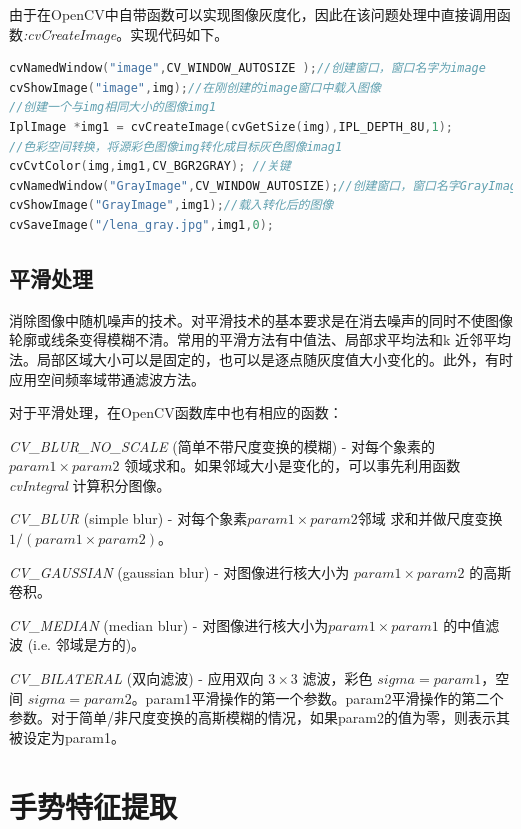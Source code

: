 \documentclass{XDBAthesis}
\begin{document}
由于在OpenCV中自带函数可以实现图像灰度化，因此在该问题处理中直接调用函数\emph{:cvCreateImage}。实现代码如下。
\begin{lstlisting}[language=C]
cvNamedWindow("image",CV_WINDOW_AUTOSIZE );//创建窗口，窗口名字为image
cvShowImage("image",img);//在刚创建的image窗口中载入图像
//创建一个与img相同大小的图像img1
IplImage *img1 = cvCreateImage(cvGetSize(img),IPL_DEPTH_8U,1);
//色彩空间转换，将源彩色图像img转化成目标灰色图像imag1
cvCvtColor(img,img1,CV_BGR2GRAY); //关键
cvNamedWindow("GrayImage",CV_WINDOW_AUTOSIZE);//创建窗口，窗口名字GrayImage
cvShowImage("GrayImage",img1);//载入转化后的图像
cvSaveImage("/lena_gray.jpg",img1,0);
\end{lstlisting}
%
%

\subsection{平滑处理}

消除图像中随机噪声的技术。对平滑技术的基本要求是在消去噪声的同时不使图像轮廓或线条变得模糊不清。常用的平滑方法有中值法、局部求平均法和k 近邻平均法。局部区域大小可以是固定的，也可以是逐点随灰度值大小变化的。此外，有时应用空间频率域带通滤波方法。

对于平滑处理，在OpenCV函数库中也有相应的函数\cite{王昭威2013基于}：

\emph{CV\_BLUR\_NO\_SCALE} (简单不带尺度变换的模糊) - 对每个象素的 $param1\times param2$ 领域求和。如果邻域大小是变化的，可以事先利用函数 \emph{cvIntegral} 计算积分图像。

\emph{CV\_BLUR} (simple blur) - 对每个象素$param1\times param2$邻域 求和并做尺度变换 $1/(param1\times param2)$。

\emph{CV\_GAUSSIAN} (gaussian blur) - 对图像进行核大小为 $param1\times param2$ 的高斯卷积。

\emph{CV\_MEDIAN} (median blur) - 对图像进行核大小为$param1\times param1$ 的中值滤波 (i.e. 邻域是方的)。

\emph{CV\_BILATERAL} (双向滤波) - 应用双向 $3\times 3$ 滤波，彩色 $sigma=param1$，空间 $sigma=param2$。param1平滑操作的第一个参数。param2平滑操作的第二个参数。对于简单/非尺度变换的高斯模糊的情况，如果param2的值为零，则表示其被设定为param1。

\section{手势特征提取}
\end{document}
